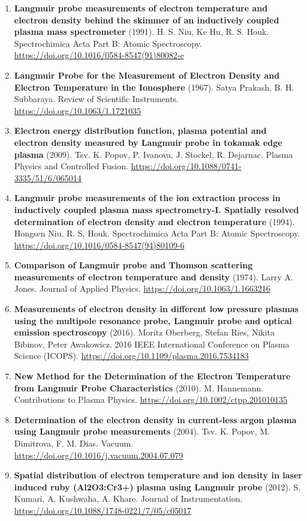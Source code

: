\documentclass[11pt,a4paper]{article}
\begin{document}
\begin{enumerate}[leftmargin=1.4em]
\item \textbf{Langmuir probe measurements of electron temperature and electron density behind the skimmer of an inductively coupled plasma mass spectrometer} (1991). H. S. Niu, Ke Hu, R. S. Houk. Spectrochimica Acta Part B: Atomic Spectroscopy. \url{https://doi.org/10.1016/0584-8547(91)80082-e}
\item \textbf{Langmuir Probe for the Measurement of Electron Density and Electron Temperature in the Ionosphere} (1967). Satya Prakash, B. H. Subbaraya. Review of Scientific Instruments. \url{https://doi.org/10.1063/1.1721035}
\item \textbf{Electron energy distribution function, plasma potential and electron density measured by Langmuir probe in tokamak edge plasma} (2009). Tsv. K. Popov, P. Ivanova, J. Stockel, R. Dejarnac. Plasma Physics and Controlled Fusion. \url{https://doi.org/10.1088/0741-3335/51/6/065014}
\item \textbf{Langmuir probe measurements of the ion extraction process in inductively coupled plasma mass spectrometry-I. Spatially resolved determination of electron density and electron temperature} (1994). Hongsen Niu, R. S. Houk. Spectrochimica Acta Part B: Atomic Spectroscopy. \url{https://doi.org/10.1016/0584-8547(94)80109-6}
\item \textbf{Comparison of Langmuir probe and Thomson scattering measurements of electron temperature and density} (1974). Larry A. Jones. Journal of Applied Physics. \url{https://doi.org/10.1063/1.1663216}
\item \textbf{Measurements of electron density in different low pressure plasmas using the multipole resonance probe, Langmuir probe and optical emission spectroscopy} (2016). Moritz Oberberg, Stefan Ries, Nikita Bibinov, Peter Awakowicz. 2016 IEEE International Conference on Plasma Science (ICOPS). \url{https://doi.org/10.1109/plasma.2016.7534183}
\item \textbf{New Method for the Determination of the Electron Temperature from Langmuir Probe Characteristics} (2010). M. Hannemann. Contributions to Plasma Physics. \url{https://doi.org/10.1002/ctpp.201010135}
\item \textbf{Determination of the electron density in current-less argon plasma using Langmuir probe measurements} (2004). Tsv. K. Popov, M. Dimitrova, F. M. Dias. Vacuum. \url{https://doi.org/10.1016/j.vacuum.2004.07.079}
\item \textbf{Spatial distribution of electron temperature and ion density in laser induced ruby (Al2O3:Cr3+) plasma using Langmuir probe} (2012). S. Kumari, A. Kushwaha, A. Khare. Journal of Instrumentation. \url{https://doi.org/10.1088/1748-0221/7/05/c05017}

\end{enumerate}
\end{document}
